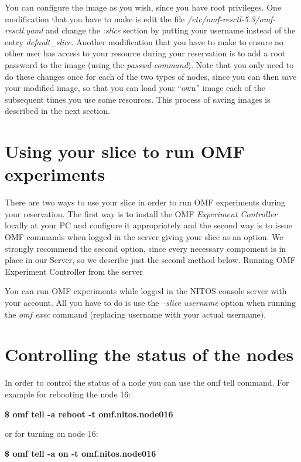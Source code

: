 \documentclass[letterpaper,10pt,english]{sphinxmanual}
\begin{document}
You can configure the image as you wish, since you have root privileges. One modification that you have to make is edit the file \emph{/etc/omf-resctl-5.3/omf-resctl.yaml} and change the \emph{:slice} section by putting your username instead of the entry \emph{default\_slice}. Another modification that you have to make to ensure no other user has access to your resource during your reservation is to add a root password to the image (using the \emph{passwd command}). Note that you only need to do these changes once for each of the two types of nodes, since you can then save your modified image, so that you can load your ``own'' image each of the subsequent times you use some resources. This process of saving images is described in the next section.


\section{Using your slice to run OMF experiments}
\label{runOMF:using-your-slice-to-run-omf-experiments}\label{runOMF::doc}
There are two ways to use your slice in order to run OMF experiments during your reservation. The first way is to install the OMF \emph{Experiment Controller} locally at your PC and configure it appropriately and the second way is to issue OMF commands when logged in the server giving your slice as an option. We strongly recommend the second option, since every necessary compoment is in place in our Server, so we describe just the second method below.
Running OMF Experiment Controller from the server

You can run OMF experiments while logged in the NITOS console server with your account. All you have to do is use the \emph{--slice username} option when running the \emph{omf exec} command (replacing username with your actual username).


\section{Controlling the status of the nodes}
\label{control_Nodes_Status::doc}\label{control_Nodes_Status:controlling-the-status-of-the-nodes}
In order to control the status of a node you can use the omf tell command. For example for rebooting the node 16:

\textbf{\$ omf tell -a reboot -t omf.nitos.node016}

or for turning on node 16:

\textbf{\$ omf tell -a on -t omf.nitos.node016}
\end{document}
